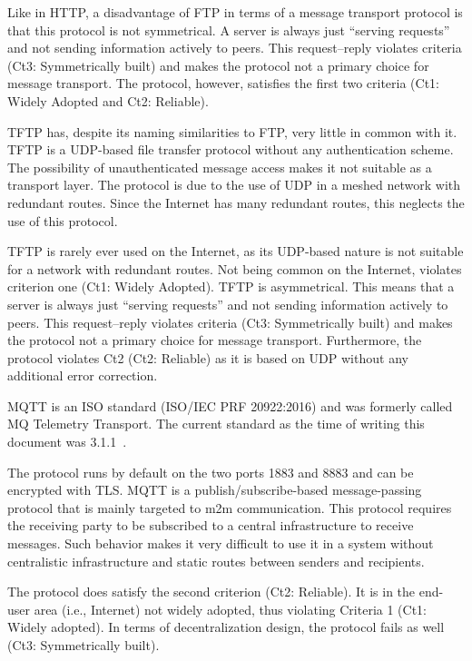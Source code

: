 Like in HTTP, a disadvantage of FTP in terms of a message transport protocol is that this protocol is not symmetrical. A server is always just ``serving requests'' and not sending information actively to peers. This request--reply violates criteria (Ct3: Symmetrically built) and makes the protocol not a primary choice for message transport. The protocol, however, satisfies the first two criteria (Ct1: Widely Adopted and Ct2: Reliable).

TFTP has, despite its naming similarities to FTP, very little in common with it. TFTP is a UDP-based file transfer protocol without any authentication scheme. The possibility of unauthenticated message access makes it not suitable as a transport layer. The protocol is due to the use of UDP in a meshed network with redundant routes. Since the Internet has many redundant routes, this neglects the use of this protocol.

TFTP is rarely ever used on the Internet, as its UDP-based nature is not suitable for a network with redundant routes. Not being common on the Internet, violates criterion one (Ct1: Widely Adopted). TFTP is asymmetrical. This means that a server is always just ``serving requests'' and not sending information actively to peers. This request--reply violates criteria (Ct3: Symmetrically built) and makes the protocol not a primary choice for message transport. Furthermore, the protocol violates Ct2 (Ct2: Reliable) as it is based on UDP without any additional error correction.

MQTT is an ISO standard (ISO/IEC PRF 20922:2016) and was formerly called MQ Telemetry Transport. The current standard as the time of writing this document was 3.1.1~\cite{mqtt}. %

The protocol runs by default on the two ports 1883 and 8883 and can be encrypted with TLS. MQTT is a publish/subscribe-based message-passing protocol that is mainly targeted to m2m communication. This protocol requires the receiving party to be subscribed to a central infrastructure to receive messages. Such behavior makes it very difficult to use it in a system without centralistic infrastructure and static routes between senders and recipients. 

The protocol does satisfy the second criterion (Ct2: Reliable). It is in the end-user area (i.e., Internet) not widely adopted, thus violating Criteria 1 (Ct1: Widely adopted). In terms of decentralization design, the protocol fails as well (Ct3: Symmetrically built).

